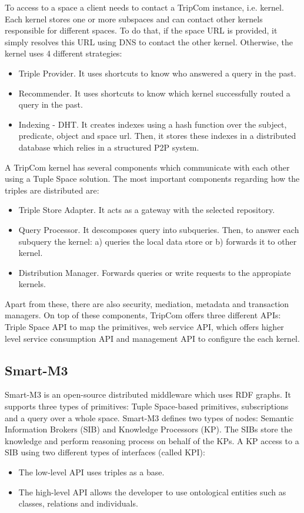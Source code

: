 To access to a space a client needs to contact a TripCom instance, i.e. kernel.
Each kernel stores one or more subspaces and can contact other kernels responsible for different spaces.
To do that, if the space URL is provided, it simply resolves this URL using DNS to contact the other kernel.
Otherwise, the kernel uses 4 different strategies:
\begin{itemize}
  \item Triple Provider. It uses shortcuts to know who answered a query in the past.
  \item Recommender. It uses shortcuts to know which kernel successfully routed a query in the past.
  \item Indexing - DHT.
	It creates indexes using a hash function over the subject, predicate, object and space url.
	Then, it stores these indexes in a distributed database which relies in a structured P2P system. %
\end{itemize}


A TripCom kernel has several components which communicate with each other using a Tuple Space solution.
The most important components regarding how the triples are distributed are:
\begin{itemize}
  \item Triple Store Adapter.
	It acts as a gateway with the selected repository.
  \item Query Processor. It descomposes query into subqueries.
	Then, to answer each subquery the kernel: a) queries the local data store or b) forwards it to other kernel.
  \item Distribution Manager.
	Forwards queries or write requests to the appropiate kernels.
\end{itemize}
Apart from these, there are also security, mediation, metadata and transaction managers.
On top of these components, TripCom offers three different APIs:
Triple Space API to map the primitives,
web service API, which offers higher level service consumption API
and management API to configure the each kernel.



\subsection{Smart-M3}

Smart-M3 is an open-source distributed middleware which uses RDF graphs. %
It supports three types of primitives: Tuple Space-based primitives, subscriptions and a query over a whole space.
Smart-M3 defines two types of nodes: Semantic Information Brokers (SIB) and Knowledge Processors (KP).
The SIBs store the knowledge and perform reasoning process on behalf of the KPs.
A KP access to a SIB using two different types of interfaces (called KPI):
\begin{itemize}
  \item The low-level API uses triples as a base.
  \item The high-level API allows the developer to use ontological entities such as classes, relations and individuals.
\end{itemize}


